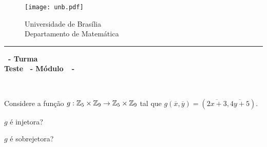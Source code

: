 \documentclass[12pt]{exam}
\begin{document}
    \begin{figure}[h]
        \begin{minipage}[c]{1.7cm}
            \texttt{[image: unb.pdf]}
        \end{minipage}
        \hspace{0pt}
        \begin{minipage}[c]{4in}
            {Universidade de Brasília} \\
            {Departamento de Matemática}
        \end{minipage}
    \end{figure}
    \hrule
    \begin{center}
        {\Large\bf \disciplina\ - Turma \turma}  \\
         {\large\bf Teste \numeroteste\ - Módulo\ \modulo\ -\ \dataavaliacao}
    \end{center}

    \\
    \vspace*{.01cm}

    \vspace{.4cm}

    \noindent Considere a função $g : \mathbb{Z}_5 \times \mathbb{Z}_9 \to \mathbb{Z}_5 \times \mathbb{Z}_9$ tal que $g(\overline{x},\overline{y}) = (\overline{2x + 3}, \overline{4y + 5})$.

    \vspace{.5cm}
    \questao $g$ é injetora?

    \vspace{1cm}
    \questao $g$ é sobrejetora?
\end{document}
